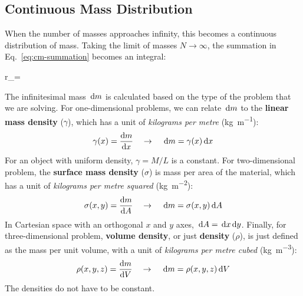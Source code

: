 

\subsection{Continuous Mass Distribution}

When the number of masses approaches infinity, this becomes a continuous
distribution of mass. Taking the limit of masses $N\rightarrow\infty$, the
summation in Eq.~\ref{eq:cm-summation} becomes an integral:
\begin{important-equation}
  \bm r_=
  \label{eq:cm-integral}
\end{important-equation}
The infinitesimal mass $\dl m$ is calculated based on the type of the problem
that we are solving. For one-dimensional problems, we can relate $\dl m$ to the
\textbf{linear mass density} ($\gamma$), which has a unit of
\emph{kilograms per metre} (\si{\kilo\gram\per\metre}):
\begin{equation}
  \gamma(x) = \diff mx\quad\rightarrow\quad \dl m =\gamma(x)\dl x
\end{equation}
For an object with uniform density, $\gamma=M/L$ is a constant. For
two-dimensional problem, the \textbf{surface mass density} ($\sigma$) is mass
per area of the material, which has a unit of \emph{kilograms per metre squared}
(\si{\kilo\gram\per\metre\squared}):
\begin{equation}
  \sigma(x,y)=\diff mA\quad\rightarrow\quad \dl m =\sigma(x,y)\dl A
\end{equation}
In Cartesian space with an orthogonal $x$ and $y$ axes, $\dl A=\dl x\dl y$.
Finally, for three-dimensional problem, \textbf{volume density}, or just
\textbf{density} ($\rho$), is just defined as the mass per unit volume, with a
unit of \emph{kilograms per metre cubed} (\si{\kilo\gram\per\metre\cubed}):
\begin{equation}
  \rho(x,y,z)=\diff mV\quad\rightarrow\quad \dl m =\rho(x,y,z)\dl V
\end{equation}
The densities do not have to be constant.

